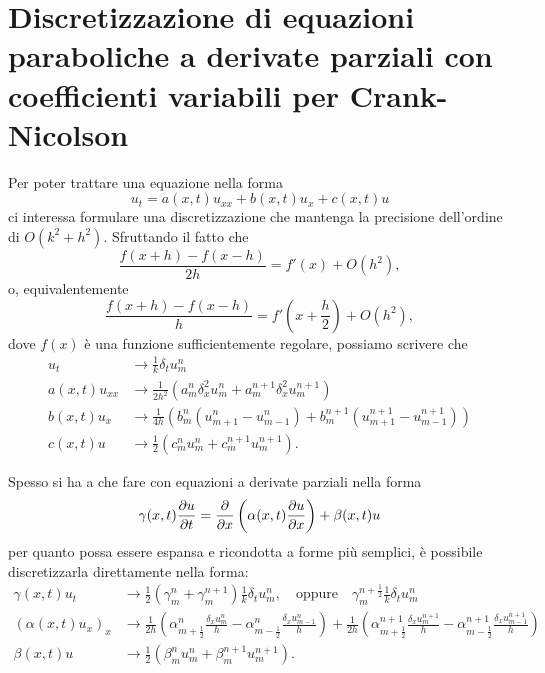 \documentclass[10pt,a4paper]{article}
\begin{document}
\section{Discretizzazione di equazioni paraboliche a derivate parziali con coefficienti variabili per Crank-Nicolson}

Per poter trattare una equazione nella forma
\begin{equation}
	u_t = a(x,t)u_{xx} + b(x,t)u_{x} + c(x,t)u
\end{equation}
ci interessa formulare una discretizzazione che mantenga la precisione dell'ordine di $O(k^2+h^2)$. Sfruttando il fatto che
\begin{equation}
	\frac{f(x+h)-f(x-h)}{2h} = f'(x)+O(h^2),
\end{equation}
o, equivalentemente
\begin{equation}
	\frac{f(x+h)-f(x-h)}{h} = f'\left(x + \frac{h}{2}\right)+O(h^2),
\end{equation}
dove $f(x)$ è una funzione sufficientemente regolare, possiamo scrivere che
\begin{align}
	u_t &\to \frac{1}{k}\delta_t u_m^n\\
	a(x,t)u_{xx} &\to \frac{1}{2h^2}(a_m^n \delta^2_x u_m^n + a_m^{n+1} \delta_x^2 u_m^{n+1})\\
	b(x,t)u_x &\to \frac{1}{4h} (b_m^n (u_{m+1}^n - u_{m-1}^n) + b_m^{n+1}(u_{m+1}^{n+1}-u_{m-1}^{n+1}))\\
	c(x,t)u &\to \frac{1}{2}(c_m^nu_m^n + c_m^{n+1}u_m^{n+1}). 
\end{align}

Spesso si ha a che fare con equazioni a derivate parziali nella forma
\begin{equation}
	\gamma(x,t)\pdv{u}{t} = \pdv{}{x}\left(\alpha(x,t) \pdv{u}{x}\right) + \beta(x,t)u
\end{equation}
per quanto possa essere espansa e ricondotta a forme più semplici, è possibile discretizzarla direttamente nella forma:
\begin{align}
	\gamma(x,t)u_t &\to \frac{1}{2}(\gamma_m^n+\gamma_m^{n+1})\frac{1}{k}\delta_t u_m^n, \quad \text{oppure} \quad \gamma_m^{n+\frac{1}{2}}\frac{1}{k}\delta_t u_m^n \\
	(\alpha(x,t)u_x)_x &\to \frac{1}{2h}\left(\alpha_{m+\frac{1}{2}}^n \frac{\delta_x u_m^n}{h} - \alpha_{m-\frac{1}{2}}^n \frac{\delta_x u_{m-1}^n}{h}\right) + \frac{1}{2h}\left(\alpha_{m+\frac{1}{2}}^{n+1} \frac{\delta_x u_m^{n+1}}{h} - \alpha_{m-\frac{1}{2}}^{n+1} \frac{\delta_x u_{m-1}^{n+1}}{h}\right) \\
	\beta(x,t)u &\to \frac{1}{2}(\beta_m^n u_m^n + \beta_m^{n+1}u_m^{n+1}).
\end{align}
\end{document}
